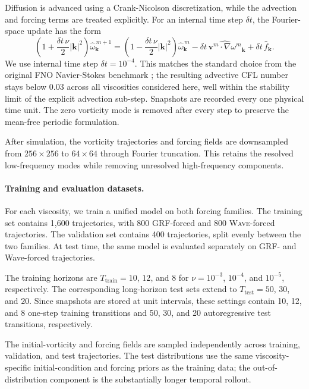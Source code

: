 \documentclass[11pt]{article}
\newcommand{\jg}[1]{{\color{red}#1}}
\begin{document}
Diffusion is advanced using a Crank-Nicolson discretization, while the advection and forcing terms are treated explicitly. For an internal time step $\delta t$, the Fourier-space update has the form
\[
    \left(
        1+\frac{\delta t\,\nu}{2}|\mathbf{k}|^2
    \right) 
    \widehat\omega^{\,m+1}_{\mathbf{k}}
    =
    \left(
        1-\frac{\delta t\,\nu}{2}|\mathbf{k}|^2
    \right)
    \widehat\omega^{\,m}_{\mathbf{k}}
    -
    \delta t\,
    \widehat{
        \mathbf{v}^m\cdot\nabla\omega^m
    }_{\mathbf{k}}
    +
    \delta t\,\widehat f_{\mathbf{k}}.
\]
We use internal time step $\delta t=10^{-4}$. \jg{This matches the standard choice from the original FNO Navier-Stokes benchmark \citep{li2020fourier}; the resulting advective CFL number stays below $0.03$ across all viscosities considered here, well within the stability limit of the explicit advection sub-step.} Snapshots are recorded every one physical time unit. The zero vorticity mode is removed after every step to preserve the mean-free periodic formulation.

After simulation, the vorticity trajectories and forcing fields are downsampled from $256\times256$ to $64\times64$ through Fourier truncation. This retains the resolved low-frequency modes while removing unresolved high-frequency components.

\paragraph{Training and evaluation datasets.}
For each viscosity, we train a unified model on both forcing families. The training set contains 1,600 trajectories, with 800 \textsc{GRF}-forced and 800 \textsc{Wave}-forced trajectories. The validation set contains 400 trajectories, split evenly between the two families. At test time, the same model is evaluated separately on GRF- and Wave-forced trajectories.

The training horizons are $T_{\mathrm{train}}=10$, $12$, and $8$ for $\nu=10^{-3}$, $10^{-4}$, and $10^{-5}$, respectively. The corresponding long-horizon test sets extend to $T_{\mathrm{test}}=50$, $30$, and $20$. Since snapshots are stored at unit intervals, these settings contain 10, 12, and 8 one-step training transitions and 50, 30, and 20 autoregressive test transitions, respectively.

The initial-vorticity and forcing fields are sampled independently across training, validation, and test trajectories. The test distributions use the same viscosity-specific initial-condition and forcing priors as the training data; the out-of-distribution component is the substantially
longer temporal rollout.
\end{document}
